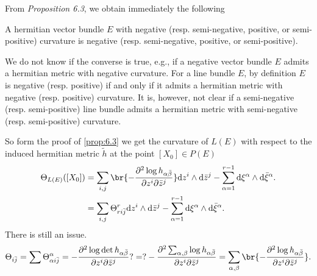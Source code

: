 \documentclass[lang=en,12pt]{beautybook}
\begin{document}
From \textit{Proposition 6.3}, we obtain immediately the following
\begin{theorem}
  A hermitian vector bundle $E$ with negative (resp. semi-negative, positive, or semi-positive) curvature is negative (resp. semi-negative, positive, or semi-positive).
\end{theorem}

We do not know if the converse is true, e.g., if a negative vector bundle $E$ admits a hermitian metric with negative curvature. For a line bundle $E$, by definition $E$ is negative (resp. positive) if and only if it admits a hermitian metric with negative (resp. positive) curvature. It is, however, not clear if a semi-negative (resp. semi-positive) line bundle admits a hermitian metric with semi-negative (resp. semi-positive) curvature.

So form the proof of \autoref{prop:6.3} we get the curvature of $L(E)$ with respect to the induced hermitian metric $\tilde{h}$ at the point $[X_0]\in P(E)$
\begin{align*}
  \Theta_{L(E)}([X_0]) &=\sum_{i,j} \br{-\dfrac{\partial^2 \log h_{\alpha \bar{\beta}}}{\partial z^i \partial \bar{z}^j} }\dd z^i\wedge \dd \bar{z}^j-\sum_{\alpha=1}^{r-1}\dd \xi^\alpha\wedge\dd \bar{\xi}^\alpha.\\ 
  &=\sum_{i,j} \Theta_{ri\bar{j}}^r \dd z^i\wedge \dd \bar{z}^j-\sum_{\alpha=1}^{r-1}\dd \xi^\alpha\wedge\dd \bar{\xi}^\alpha.
\end{align*}
There is still an issue.
\begin{align*}
  \Theta_{i\bar{j}} =\sum \Theta^\alpha_{\alpha i\bar{j}} =-\dfrac{\partial^2\log \det h_{\alpha\bar{\beta}}}{\partial z^i \partial\bar{z}^j}
  ?=?-\dfrac{\partial^2 \sum_{\alpha,\beta}\log h_{\alpha\bar{\beta}}}{\partial z^i \partial\bar{z}^j}
  =\sum_{\alpha,\beta} \br{-\dfrac{\partial^2 \log h_{\alpha\bar{\beta}}}{\partial z^i \partial\bar{z}^j}}.
\end{align*}
\end{document}
